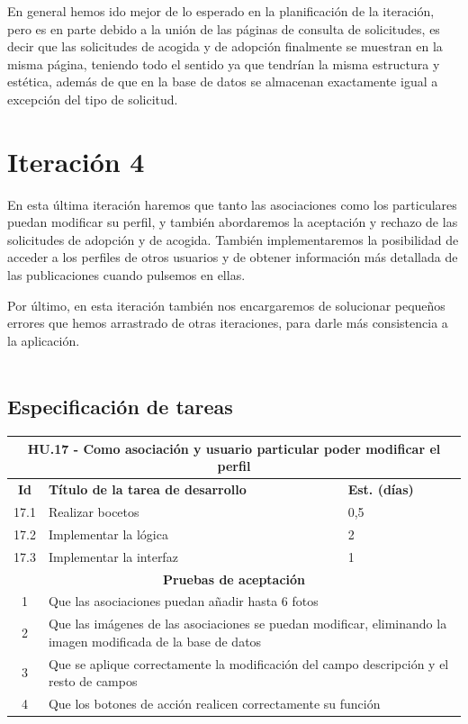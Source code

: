 \pagebreak

En general hemos ido mejor de lo esperado en la planificación de la iteración, pero es en parte debido a la unión de las páginas de consulta de solicitudes, es decir que las solicitudes de acogida y de adopción finalmente se muestran en la misma página, teniendo todo el sentido ya que tendrían la misma estructura y estética, además de que en la base de datos se almacenan exactamente igual a excepción del tipo de solicitud. 

\section{Iteración 4}

En esta última iteración haremos que tanto las asociaciones como los particulares puedan modificar su perfil, y también abordaremos la aceptación y rechazo de las solicitudes de adopción y de acogida. También implementaremos la posibilidad de acceder a los perfiles de otros usuarios y de obtener información más detallada de las publicaciones cuando pulsemos en ellas.

Por último, en esta iteración también nos encargaremos de solucionar pequeños errores que hemos arrastrado de otras iteraciones, para darle más consistencia a la aplicación. \\ \\

\subsection{Especificación de tareas}

\begin{table}[H]
	\centering
\begin{tabular}{|c|p{9.5cm}|p{1cm}|}
	\hline
	\multicolumn{3}{|p{10.5cm}|}{\textbf{HU.17 - Como asociación y usuario particular poder modificar el perfil}} \\
	\hline
	\textbf{Id} & \textbf{Título de la tarea de desarrollo} & \textbf{Est. (días)} \\
	\hline
	17.1 & Realizar bocetos & 0,5 \\ \hline
	17.2 &  Implementar la lógica & 2 \\ \hline
	17.3 &  Implementar la interfaz & 1 \\ \hline
	\multicolumn{3}{|c|}{\textbf{Pruebas de aceptación}} \\ \hline
	1 & \multicolumn{2}{|p{12cm}|}{Que las asociaciones puedan añadir hasta 6 fotos} \\ \hline
	2 & \multicolumn{2}{|p{12cm}|}{Que las imágenes de las asociaciones se puedan modificar, eliminando la imagen modificada de la base de datos} \\ \hline
	3 & \multicolumn{2}{|p{12cm}|}{Que se aplique correctamente la modificación del campo descripción y el resto de campos} \\ \hline
	4 & \multicolumn{2}{|p{12cm}|}{Que los botones de acción realicen correctamente su función} \\ \hline
	
\end{tabular}
\end{table}

